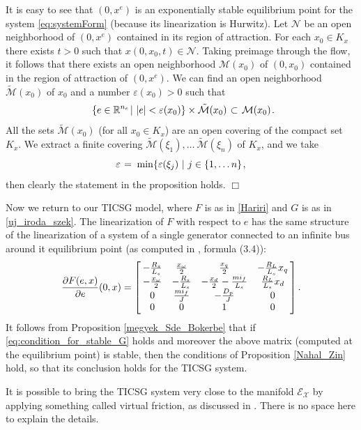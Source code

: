 \documentclass{ifacconf}
\newcommand{\rline}  {{\mathbb R}}
\renewcommand{\o}    {{\omega}}
\renewcommand{\e}    {{\varepsilon}}
\newcommand{\m}      {{\hbox{\hskip 1pt}}}
\newcommand{\nm}     {{\hbox{\hskip -3pt}}}
\newcommand{\Emscr}  {{\mathcal{E}}}
\newcommand{\Mmscr}  {{\mathcal{M}}}
\newcommand{\Nmscr}  {{\mathcal{N}}}
\newcommand{\Xmscr}  {{\mathcal{X}}}
\begin{document}
\begin{pf} It is easy to see that $(0,x^e)$ is an exponentially 
stable equilibrium point for the system \eqref{eq:systemForm} (because
its linearization is Hurwitz). Let $\Nmscr$ be an open neighborhood of
$(0,x^e)$ contained in its region of attraction. For each $x_0\in K_x$
there exists $t>0$ such that $x(0,x_0,t)\in\Nmscr$. Taking preimage
through the flow, it follows that there exists an open neighborhood
$\Mmscr(x_0)$ of $(0,x_0)$ contained in the region of attraction of
$(0,x^e)$. We can find an open neighborhood $\tilde {\Mmscr}(x_0)$ of
$x_0$ and a number $\e(x_0)>0$ such that \vspace{-2mm}
$$ \m\ \{e\in\rline^{n_e}\m|\ |e|<\e(x_0)\}\times\tilde{\Mmscr}(x_0) 
   \m\subset\m \Mmscr(x_0) \m.$$
All the sets $\tilde\Mmscr(x_0)$ (for all $x_0\in K_x$) are an open 
covering of the compact set $K_x$. We extract a finite covering 
$\tilde\Mmscr(\xi_1),\ldots\ \tilde\Mmscr(\xi_n)$ of $K_x$, and we 
take
$$\e \m=\m \min\{\e(\xi_j)\ |\ j\in\{1,\ldots n\} \m,$$
then clearly the statement in the proposition holds. \m $\Box$
\end{pf} 

Now we return to our TICSG model, where $F$ is as in \eqref{Hariri}
and $G$ is as in \eqref{uj_iroda_szek}. The linearization of $F$ with
respect to $e$ has the same structure of the linearization of a
system of a single generator connected to an infinite bus around it
equilibrium point (as computed in \cite{NaWe:15}, formula (3.4)):
$$ \frac{\partial F(e,x)}{\partial e}(0,x) = \left[\nm
   \begin{array}{cccc} -\frac{R_s}{L_s} & \frac{x_{\o}}{2} & 
   \frac{x_q}{2} & -\frac{R_L}{L_s} x_q\\ -\frac{x_{\o}}{2} &
   -\frac{R_s}{L_s} & -\frac{x_d}{2}-\frac{mi_f}{L_s} & 
   \frac{R_L}{L_s} x_d\\ 0 & \frac{mi_f}{J} & -\frac{D_p}{J} 
   & 0\\ 0 & 0 & 1 & 0 \end{array} \nm\right].$$
It follows from Proposition \ref{megyek_Sde_Bokerbe} that if 
\eqref{eq:condition_for_stable_G} holds and moreover the above matrix
(computed at the equilibrium point) is stable, then the conditions of
Proposition \ref{Nahal_Zin} hold, so that its conclusion holds for
the TICSG system.

It is possible to bring the TICSG system very close to the manifold
$\Emscr_\Xmscr$ by applying something called virtual friction, as 
discussed in \cite{BrWe:14}. There is no space here to explain the 
details.
\end{document}
